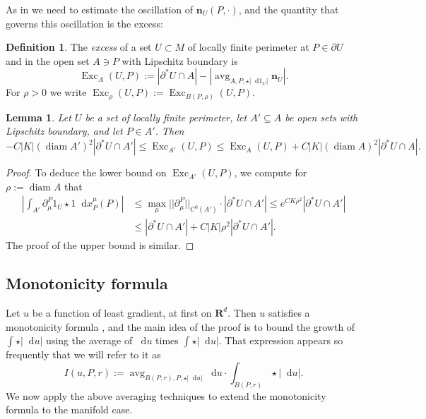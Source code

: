 \documentclass[reqno,11pt]{amsart}
\newcommand{\RR}{\mathbf{R}}
\DeclareMathOperator{\avg}{avg}
\DeclareMathOperator{\diam}{diam}
\DeclareMathOperator{\Exc}{Exc}
\newcommand*\dif{\mathop{}\!\mathrm{d}}
\newcommand{\normal}{\mathbf n}
\newcommand{\dfn}[1]{\emph{#1}\index{#1}}
\newtheorem{lemma}[theorem]{Lemma}
\theoremstyle{definition}
\newtheorem{definition}[theorem]{Definition}
\numberwithin{equation}{section}
\begin{document}
As in \cite[Chapters 8-9]{Giusti77} we need to estimate the oscillation of $\normal_U(P, \cdot)$, and the quantity that governs this oscillation is the excess:

\begin{definition}
The \dfn{excess} of a set $U \subset M$ of locally finite perimeter at $P \in \partial U$ and in the open set $A \ni P$ with Lipschitz boundary is
$$\Exc_A(U, P) := |\partial^* U \cap A| - \left|\avg_{A, P, \star |\dif 1_U|} \normal_U\right|.$$
For $\rho > 0$ we write $\Exc_\rho(U, P) := \Exc_{B(P, \rho)}(U, P)$.
\end{definition}

\begin{lemma}
Let $U$ be a set of locally finite perimeter, let $A' \subseteq A$ be open sets with Lipschitz boundary, and let $P \in A'$. Then
\begin{equation}\label{approximate monotone}
-C |K| (\diam A')^2 |\partial^* U \cap A'| \leq \Exc_{A'}(U, P) \leq \Exc_A(U, P) + C |K|(\diam A)^2 |\partial^* U \cap A|.
\end{equation}
\end{lemma}
\begin{proof}
To deduce the lower bound on $\Exc_{A'}(U, P)$, we compute for $\rho := \diam A$ that
\begin{align*}
    \left|\int_{A'} \partial^P_\mu 1_U \star 1 \dif x_P^\mu(P)\right|
 & \leq \max_\mu ||\partial^P_\mu||_{C^0(A')} \cdot |\partial^* U \cap A'| \leq e^{CK\rho^2} |\partial^* U \cap A'| \\
 & \leq |\partial^* U \cap A'| + C|K|\rho^2 |\partial^* U \cap A'|.
\end{align*}
The proof of the upper bound is similar.
\end{proof}


\subsection{Monotonicity formula}\label{MollifierSection}
Let $u$ be a function of least gradient, at first on $\RR^d$.
Then $u$ satisfies a monotonicity formula \cite[Theorem 5.12]{Giusti77}, and the main idea of the proof is to bound the growth of $\int \star |\dif u|$ using the average of $\dif u$ times $\int \star |\dif u|$.
That expression appears so frequently that we will refer to it as
\begin{equation}\label{integral of du}
I(u, P, r) := \avg_{B(P, r), P, \star |\dif u|} \dif u \cdot \int_{B(P, r)} \star |\dif u|.
\end{equation}
We now apply the above averaging techniques to extend the monotonicity formula to the manifold case.
\end{document}
